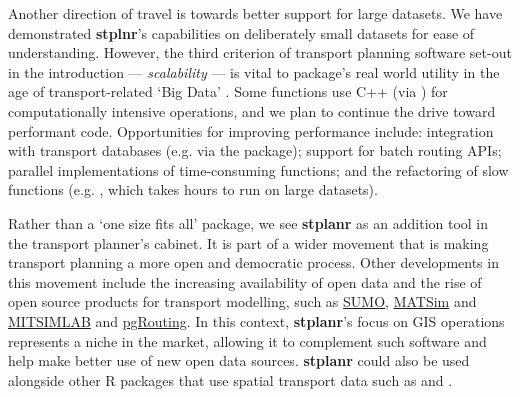 Another direction of travel is towards better support for large datasets.
We have demonstrated \textbf{stplnr}'s capabilities on deliberately small datasets for ease of understanding.
However, the third criterion of transport planning software set-out in the introduction --- \emph{scalability} --- is vital to package's real world utility in the age of transport-related `Big Data' \citep{lovelace_big_2016}.
Some functions use C++ (via ) for computationally intensive operations, and we plan to continue the drive toward performant code.
Opportunities for improving performance include:
integration with transport databases (e.g. via the  package);
support for batch routing APIs;
parallel implementations of time-consuming functions;
and the refactoring of slow functions (e.g. , which takes hours to run on large datasets).


Rather than a `one size fits all' package, we see \textbf{stplanr} as an addition tool in the transport planner's cabinet.
It is part of a wider movement that is making transport
planning a more open and democratic process. Other developments in this
movement include the increasing availability of open data
\citep{naumova_building_2016} and the rise of open source products for
transport modelling, such as
\href{http://www.dlr.de/ts/en/desktopdefault.aspx/tabid-9883/16931_read-41000/}{SUMO},
\href{http://www.matsim.org/}{MATSim} and
\href{https://its.mit.edu/software/mitsimlab}{MITSIMLAB}
\citep{saidallah_comparative_2016} and
\href{http://pgrouting.org/}{pgRouting}.
In this context, \textbf{stplanr}'s focus on
GIS operations represents a niche in the market, allowing it to
complement such software and help make better use of new open data
sources.
\textbf{stplanr} could also be used alongside other R packages that
use spatial transport data such as  and
 \citep{RJ-2017-020}.

